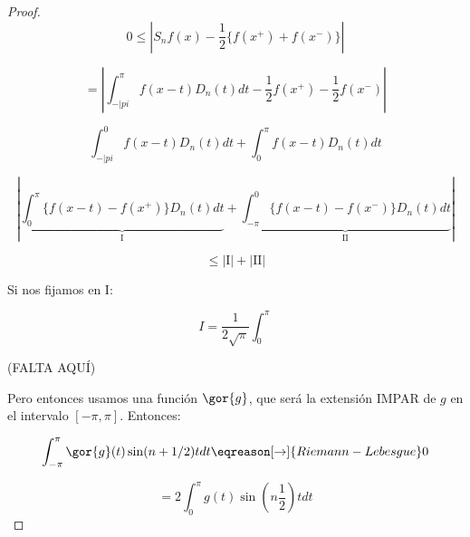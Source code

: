 	\begin{proof}

		\[ 0 \leq | S_n f(x) - \frac{1}{2} \{f(x^+) + f(x^-)\} |\]

		\[ = \left| \int_{-|pi}^\pi f(x-t) D_n (t) dt - \frac{1}{2} f(x^+)- \frac{1}{2} f(x^-) \right|  \]

		\[ \int_{-|pi}^{0} f(x-t) D_n(t)dt + \int_{0}^\pi f(x-t) D_n(t) dt \]

		\[ \left| \underbrace{\int_0^\pi  \{ f(x-t) - f(x^+) \} D_n(t) dt }_{\text{I}} + \underbrace{\int_{-\pi}^{0}  \{ f(x-t) - f(x^-) \} D_n(t) dt }_{\text{II}} \right| \]

		\[\leq | \text{I} | +  |\text{II}| \]

		Si nos fijamos en I:

		\[ I = \frac{1}{2\sqrt{\pi}} \int_{0}^\pi \]

		(FALTA AQUÍ)

		Pero entonces usamos una función $\gor{g}$, que será la extensión IMPAR de $g$ en el intervalo $[-\pi,\pi]$. Entonces:

		\[ \int_{-\pi}^\pi  \gor{g}(t) \sin(n+1/2)t dt \eqreason[\rightarrow]{Riemann-Lebesgue} 0 \]

		\[ = 2 \int_{0}^\pi g(t) \sin(n \frac{1}{2}) t dt \]


	\end{proof}


